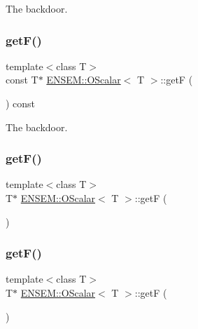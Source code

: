 The backdoor. 

\mbox{\label{classENSEM_1_1OScalar_a8e87e97e45239d934b0d141dcf9b92d7}} 
\subsubsection{\texorpdfstring{getF()}{getF()}\hspace{0.1cm}{\footnotesize\ttfamily [3/6]}}
{\footnotesize\ttfamily template$<$class T$>$ \\
const T$\ast$ \mbox{\hyperlink{classENSEM_1_1OScalar}{E\+N\+S\+E\+M\+::\+O\+Scalar}}$<$ T $>$\+::getF (\begin{DoxyParamCaption}{ }\end{DoxyParamCaption}) const\hspace{0.3cm}{\ttfamily [inline]}}



The backdoor. 

\mbox{\label{classENSEM_1_1OScalar_a040999918115f255a411fd96ad87663f}} 
\subsubsection{\texorpdfstring{getF()}{getF()}\hspace{0.1cm}{\footnotesize\ttfamily [4/6]}}
{\footnotesize\ttfamily template$<$class T$>$ \\
T$\ast$ \mbox{\hyperlink{classENSEM_1_1OScalar}{E\+N\+S\+E\+M\+::\+O\+Scalar}}$<$ T $>$\+::getF (\begin{DoxyParamCaption}{ }\end{DoxyParamCaption})\hspace{0.3cm}{\ttfamily [inline]}}

\mbox{\label{classENSEM_1_1OScalar_a040999918115f255a411fd96ad87663f}} 
\subsubsection{\texorpdfstring{getF()}{getF()}\hspace{0.1cm}{\footnotesize\ttfamily [5/6]}}
{\footnotesize\ttfamily template$<$class T$>$ \\
T$\ast$ \mbox{\hyperlink{classENSEM_1_1OScalar}{E\+N\+S\+E\+M\+::\+O\+Scalar}}$<$ T $>$\+::getF (\begin{DoxyParamCaption}{ }\end{DoxyParamCaption})\hspace{0.3cm}{\ttfamily [inline]}}

